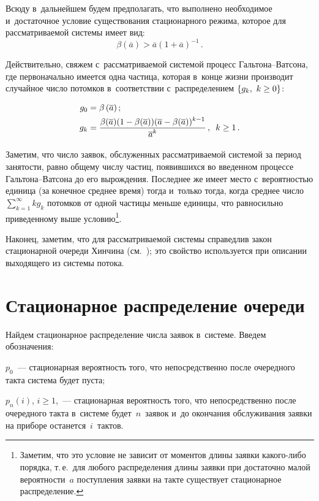 \begin{multicols}{2}
Всюду в~дальнейшем будем предполагать, что выполнено необходимое
и~достаточное условие существования стационарного режима, которое
для рассматриваемой системы имеет вид:
$$
\beta\left(\overline{a}\right)
>\overline{a} \left(1+\overline{a}\right)^{-1}\,.
$$



Действительно, свяжем с~рассматриваемой сис\-те\-мой процесс Галь\-то\-на--Ват\-со\-на,
где первоначально имеется одна частица, которая в~конце
жизни производит случайное число потомков в~соответствии
с~распределением ${\{g_k, \ k\hm\ge 0\}}$: 

\noindent
\begin{align*}
g_0&=\beta\left(\overline{a}\right);\\
g_k&=\fr{\beta(\overline{a})(1\hm-\beta(\overline{a}))
(\overline{a}-\beta(\overline{a}))^{k-1}}{\overline{a}^k}\,,\enskip k\ge 1\,.
\end{align*}

\vspace*{-2pt}

Заметим, что число заявок, обслуженных рассматриваемой системой за период занятости,
\mbox{равно} общему числу частиц, появившихся во введенном процессе Галь\-то\-на--Ват\-со\-на 
до его вы\-рож\-де\-ния.
Последнее же  имеет место
с~вероятностью единица (за конечное среднее время) тогда и~только
тогда, когда среднее число $\sum\nolimits_{k=1}^\infty  k g_k$
потомков от одной частицы меньше единицы, что равносильно приведенному выше 
условию\footnote[3]{Заметим,
что это условие не зависит от моментов длины заявки ка\-ко\-го-ли\-бо порядка, т.\,е.\ для любого
распределения длины заявки при достаточно малой вероятности~$a$ поступления заявки на такте
существует стационарное распределение.}.

Наконец, заметим, что для рассматриваемой системы справедлив закон стационарной
очереди Хинчина (см.~\cite[п.~4.1.1]{distime}); это свойство используется
при описании выходящего из системы потока.

\vspace*{-6pt}


\section{Стационарное распределение очереди}

\vspace*{-2pt}

Найдем стационарное распределение числа заявок в~системе. Введем
обозначения:
\begin{description}
\item
$p_0$~--- стационарная вероятность того, что непосредственно после очередного такта система будет
пуста;
\item
$p_n(i)$, $i \ge 1$,~---
стационарная вероятность того,
что непосредственно после очередного такта в~системе будет~$n$~заявок 
и~до окончания обслуживания
заявки на приборе останется~$i$~тактов.
\end{description}


\end{multicols}

